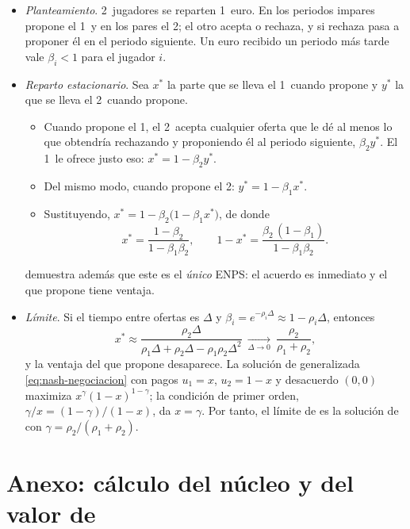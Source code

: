 \documentclass[11pt]{article}
\begin{document}
\begin{itemize}
\item \emph{Planteamiento}\nocite{Rubinstein1982Perfect}. 2~jugadores se reparten 1~euro. En los periodos impares propone el 1~y en los pares el 2; el otro acepta o rechaza, y si rechaza pasa a proponer él en el periodo siguiente. Un euro recibido un periodo más tarde vale $\beta_i<1$ para el jugador $i$.
\item \emph{Reparto estacionario}. Sea $x^*$ la parte que se lleva el 1~cuando propone y $y^*$ la que se lleva el 2~cuando propone.
  \begin{itemize}
  \item Cuando propone el 1, el 2~acepta cualquier oferta que le dé al menos lo que obtendría rechazando y proponiendo él al periodo siguiente, $\beta_2y^*$. El 1~le ofrece justo eso: $x^*=1-\beta_2y^*$.
  \item Del mismo modo, cuando propone el 2: $y^*=1-\beta_1x^*$.
  \item Sustituyendo, $x^*=1-\beta_2\big(1-\beta_1x^*\big)$, de donde
\[
x^*=\frac{1-\beta_2}{1-\beta_1\beta_2},\qquad 1-x^*=\frac{\beta_2\,(1-\beta_1)}{1-\beta_1\beta_2}.
\]
  \end{itemize}
  \textcite{Rubinstein1982Perfect} demuestra además que este es el \emph{único} ENPS: el acuerdo es inmediato y el que propone tiene ventaja.\findemo
\item \emph{Límite}\nocite{BinmoreRubinsteinWolinsky1986Nash}. Si el tiempo entre ofertas es $\Delta$ y $\beta_i=e^{-\rho_i\Delta}\approx1-\rho_i\Delta$, entonces
\[
x^*\approx\frac{\rho_2\Delta}{\rho_1\Delta+\rho_2\Delta-\rho_1\rho_2\Delta^2}\ \xrightarrow[\Delta\to0]{}\ \frac{\rho_2}{\rho_1+\rho_2},
\]
  y la ventaja del que propone desaparece. La solución de  generalizada \eqref{eq:nash-negociacion} con pagos $u_1=x$, $u_2=1-x$ y desacuerdo $(0,0)$ maximiza $x^{\gamma}(1-x)^{1-\gamma}$; la condición de primer orden, $\gamma/x=(1-\gamma)/(1-x)$, da $x=\gamma$. Por tanto, el límite de  es la solución de  con $\gamma=\rho_2/(\rho_1+\rho_2)$.\findemo
\end{itemize}

\section{Anexo: cálculo del núcleo y del valor de }\label{anexo:cooperativos}
\end{document}
